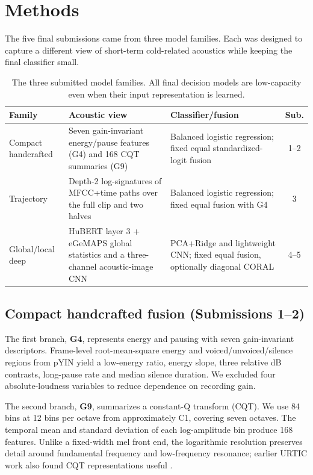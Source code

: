 \section{Methods}
\label{sec:methods}

The five final submissions came from three model families. Each was designed
to capture a different view of short-term cold-related acoustics while keeping
the final classifier small.

\begin{table}[t]
\centering
\caption{The three submitted model families. All final decision models are
low-capacity even when their input representation is learned.}
\label{tab:families}
\small
\begin{tabular}{p{2.5cm}p{6.4cm}p{4.0cm}c}
\toprule
Family & Acoustic view & Classifier/fusion & Sub. \\
\midrule
Compact handcrafted & Seven gain-invariant energy/pause features (G4) and 168 CQT summaries (G9) & Balanced logistic regression; fixed equal standardized-logit fusion & 1--2 \\
Trajectory & Depth-2 log-signatures of MFCC+time paths over the full clip and two halves & Balanced logistic regression; fixed equal fusion with G4 & 3 \\
Global/local deep & HuBERT layer 3 + eGeMAPS global statistics and a three-channel acoustic-image CNN & PCA+Ridge and lightweight CNN; fixed equal fusion, optionally diagonal CORAL & 4--5 \\
\bottomrule
\end{tabular}
\end{table}

\subsection{Compact handcrafted fusion (Submissions 1--2)}

The first branch, \textbf{G4}, represents energy and pausing with seven
gain-invariant descriptors. Frame-level root-mean-square energy and
voiced/unvoiced/silence regions from pYIN yield a low-energy ratio, energy
slope, three relative dB contrasts, long-pause rate and median silence
duration. We excluded four absolute-loudness variables to reduce dependence on
recording gain.

The second branch, \textbf{G9}, summarizes a constant-Q transform (CQT). We
use 84 bins at 12 bins per octave from approximately C1, covering seven
octaves. The temporal mean and standard deviation of each log-amplitude bin
produce 168 features. Unlike a fixed-width mel front end, the logarithmic
resolution preserves detail around fundamental frequency and low-frequency
resonance; earlier URTIC work also found CQT representations useful
\cite{cai2017cold}.

